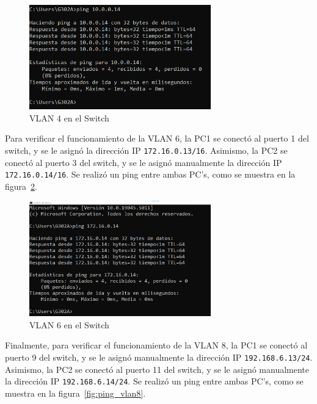         \begin{figure}[H]
            \centering
            \includegraphics[width=0.7\textwidth]{img/ping_vlan4.png}
            \caption{VLAN 4 en el Switch}
            \label{fig:ping_vlan4}
        \end{figure}

        Para verificar el funcionamiento de la VLAN 6, la PC1 se conectó al puerto 1 del switch, y se le asignó la dirección IP \texttt{172.16.0.13/16}. Asimismo, la PC2 se conectó al puerto 3 del switch, y se le asignó manualmente la dirección IP \texttt{172.16.0.14/16}. Se realizó un ping entre ambas PC's, como se muestra en la figura~\ref{fig:ping_vlan6}.

        \begin{figure}[H]
            \centering
            \includegraphics[width=0.7\textwidth]{img/ping_vlan6.png}
            \caption{VLAN 6 en el Switch}
            \label{fig:ping_vlan6}
        \end{figure}

        Finalmente, para verificar el funcionamiento de la VLAN 8, la PC1 se conectó al puerto 9 del switch, y se le asignó manualmente la dirección IP \texttt{192.168.6.13/24}. Asimismo, la PC2 se conectó al puerto 11 del switch, y se le asignó manualmente la dirección IP \texttt{192.168.6.14/24}. Se realizó un ping entre ambas PC's, como se muestra en la figura~\ref{fig:ping_vlan8}.

